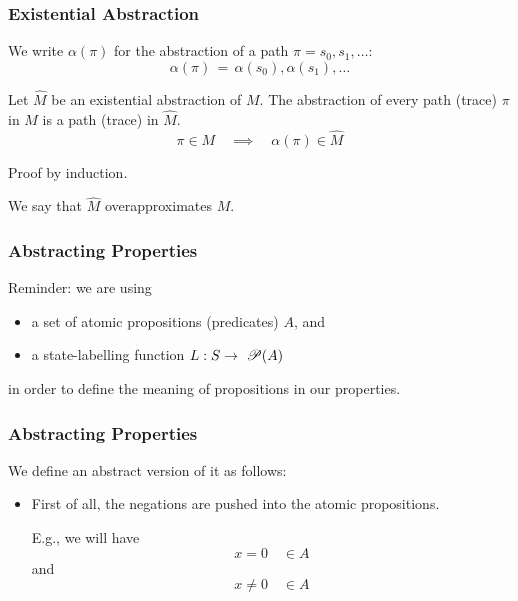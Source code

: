 
\begin{frame}
\frametitle{Existential Abstraction}

We write $\alpha(\pi)$ for the abstraction of a path $\pi=s_0,s_1,\ldots$:
%
\[ \alpha(\pi) \,=\, \alpha(s_0), \alpha(s_1), \ldots \]
\vfill
\pause

\begin{lemma}
Let $\hat M$ be an existential abstraction of $M$.
The abstraction of every path (trace) $\pi$ in $M$ is a path
(trace) in $\hat M$.
\[ \pi \in M \quad\implies\quad \alpha(\pi) \in \hat M \]
\end{lemma}

Proof by induction.

We say that $\hat M$ \alert{overapproximates} $M$.

\end{frame}


\begin{frame}
\frametitle{Abstracting Properties}

Reminder: we are using
%
\begin{itemize}
\item a set of \alert{atomic propositions} (predicates) $A$, and
\item a \alert{state-labelling function} $L : S \rightarrow \ \mathscr P({A})$
\end{itemize}
%
in order to define the meaning of propositions in our properties.

\end{frame}


\begin{frame}
\frametitle{Abstracting Properties}

We define an abstract version of it as follows:

\begin{itemize}
\item First of all, the negations are pushed into the atomic propositions.

E.g., we will have
\[ x=0 \quad \in A \]
\alert{and}
\[ x\not =0 \quad \in A \]

\end{itemize}

\end{frame}

